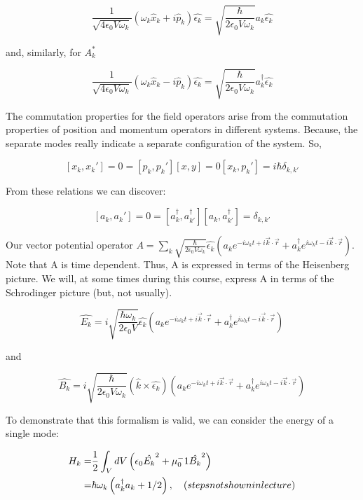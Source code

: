 \documentclass{article}
\begin{document}
\[ 
    \frac{1}{\sqrt{4 \epsilon_0 V \omega_k}} \left( \omega_k \hat{x}_k + i
    \hat{p}_k \right) \hat{\epsilon_k} = \sqrt{\frac{\hbar}{2 \epsilon_0
    V \omega_k}} a_k \hat{\epsilon_k}
\]

and, similarly, for $A_k^*$

\[ 
    \frac{1}{\sqrt{4 \epsilon_0 V \omega_k}} \left( \omega_k \hat{x}_k - i
    \hat{p}_k \right) \hat{\epsilon_k} = \sqrt{\frac{\hbar}{2 \epsilon_0
    V \omega_k}} a_k^\dagger \hat{\epsilon_k}
\]

The commutation properties for the field operators arise from the commutation
properties of position and momentum operators in different systems. Because, the
separate modes really indicate a separate configuration of the system. So,

\[
    [x_k, x_k'] = 0 = [p_k, p_k']
    [x,y] = 0
    [x_k , p_k'] = i \hbar \delta_{k,k'}
\]

From these relations we can discover:

\[ 
    [a_k, a_k' ] = 0 =[a_k^\dagger, a_{k'}^\dagger]
    [a_k, a_{k'}^\dagger] = \delta_{k,k'}
\]

Our vector potential operator $A = \sum_k \sqrt{\frac{\hbar}{2\epsilon_0 V
\omega_k}} \hat{\epsilon_k} \left( a_k e^{-i \omega_k t + i \vec{k}\cdot
\vec{r}} + a_k^\dagger e^{i \omega_k t - i \vec{k} \cdot \vec{r}} \right)$. Note
that A is time dependent. Thus, A is expressed in terms of the Heisenberg
picture. We will, at some times during this course, express A in terms of the
Schrodinger picture (but, not usually).

\[ 
    \hat{E_k} = i \sqrt{\frac{\hbar \omega_k}{2 \epsilon_0 V}} \hat{\epsilon_k}
    \left(a_k e^{-i \omega_k t + i \vec{k}\cdot
\vec{r}} + a_k^\dagger e^{i \omega_k t - i \vec{k} \cdot \vec{r}} \right)
\]

and

\[ 
    \hat{B_k} = i \sqrt{\frac{\hbar }{2 \epsilon_0 V \omega_k}}
    \left(\hat{k} \times \hat{\epsilon_k} \right)
    \left(a_k e^{-i \omega_k t + i \vec{k}\cdot
\vec{r}} + a_k^\dagger e^{i \omega_k t - i \vec{k} \cdot \vec{r}} \right)
\]

To demonstrate that this formalism is valid, we can consider the energy of a
single mode:

\begin{align*}
    H_k =& \frac{1}{2} \int_V dV \left( \epsilon_0 \hat{E_k}^2 + \mu_0^-1
\hat{B_k}^2 \right) \\
=& \hbar \omega_k \left( a_k^\dagger a_k + 1/2 \right) ,\quad \text(steps not
shown in lecture)
\end{align*}
\end{document}
